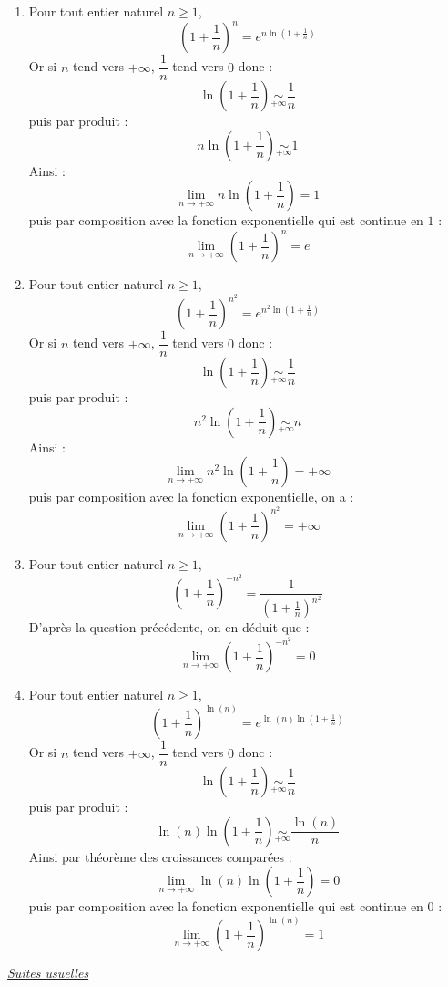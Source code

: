 \documentclass[a4paper,10pt]{report}
\begin{document}
\corr 

\begin{enumerate}
\item Pour tout entier naturel $n \geq 1$,
$$ \left( 1 + \frac{1}{n} \right)^n = e^{n \ln \left(1 + \frac{1}{n} \right)}$$
Or si $n$ tend vers $+ \infty$, $\dfrac{1}{n}$ tend vers $0$ donc :
$$  \ln \left(1 + \frac{1}{n} \right) \underset{ + \infty}{\sim} \frac{1}{n}$$
puis par produit :
$$ n \ln \left(1 + \frac{1}{n} \right) \underset{ + \infty}{\sim} 1$$
Ainsi :
$$ \lim_{n \rightarrow + \infty} n \ln \left(1 + \frac{1}{n} \right) = 1$$
puis par composition avec la fonction exponentielle qui est continue en $1$ : 
$$ \lim_{n \rightarrow + \infty} \left( 1 + \frac{1}{n} \right)^n = e$$
\item Pour tout entier naturel $n \geq 1$,
$$ \left( 1 + \frac{1}{n} \right)^{n^2} = e^{n^2 \ln \left(1 + \frac{1}{n} \right)}$$
Or si $n$ tend vers $+ \infty$, $\dfrac{1}{n}$ tend vers $0$ donc :
$$  \ln \left(1 + \frac{1}{n} \right) \underset{ + \infty}{\sim} \frac{1}{n}$$
puis par produit :
$$ n^2 \ln \left(1 + \frac{1}{n} \right) \underset{ + \infty}{\sim} n$$
Ainsi :
$$ \lim_{n \rightarrow + \infty} n^2 \ln \left(1 + \frac{1}{n} \right) = + \infty$$
puis par composition avec la fonction exponentielle, on a :
$$ \lim_{n \rightarrow + \infty} \left( 1 + \frac{1}{n} \right)^{n^2} = + \infty$$
\item Pour tout entier naturel $n \geq 1$,
$$ \left(1+ \frac{1}{n}\right)^{-n^2} = \dfrac{1}{\left(1+ \frac{1}{n}\right)^{n^2}}$$
D'après la question précédente, on en déduit que :
$$ \lim_{n \rightarrow + \infty} \left(1+ \frac{1}{n}\right)^{-n^2} = 0$$
\item Pour tout entier naturel $n \geq 1$,
$$ \left( 1 + \frac{1}{n} \right)^{\ln(n)} = e^{\ln(n) \ln \left(1 + \frac{1}{n} \right)}$$
Or si $n$ tend vers $+ \infty$, $\dfrac{1}{n}$ tend vers $0$ donc :
$$  \ln \left(1 + \frac{1}{n} \right) \underset{ + \infty}{\sim} \frac{1}{n}$$
puis par produit :
$$ \ln(n) \ln \left(1 + \frac{1}{n} \right) \underset{ + \infty}{\sim} \dfrac{\ln(n)}{n}$$
Ainsi par théorème des croissances comparées :
$$ \lim_{n \rightarrow + \infty} \ln(n) \ln \left(1 + \frac{1}{n} \right) = 0$$
puis par composition avec la fonction exponentielle qui est continue en $0$ : 
$$ \lim_{n \rightarrow + \infty} \left( 1 + \frac{1}{n} \right)^{\ln(n)} = 1$$
\end{enumerate}


\bigskip

\begin{center}
{\large \textit{\underline{Suites usuelles}}}
\end{center}
\bigskip
\end{document}
